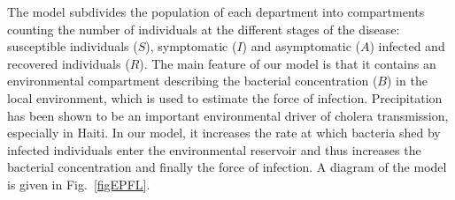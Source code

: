The model subdivides the population of each department into compartments counting the number of individuals at the different stages of the disease: susceptible individuals ($S$), symptomatic ($I$) and asymptomatic ($A$) infected and recovered individuals ($R$). The main feature of our model is that it contains an environmental compartment describing the bacterial concentration ($B$) in the local environment, which is used to estimate the force of infection\cite{Rinaldo:Reassessment20102011:2012, Bertuzzo:PredictionSpatialEvolution:2011}. Precipitation has been shown to be an important environmental driver of cholera transmission\cite{Camacho:CholeraEpidemicYemen:2018}, especially in Haiti\cite{Rinaldo:Reassessment20102011:2012}. In our model, it increases the rate at which bacteria shed by infected individuals enter the environmental reservoir and thus increases the bacterial concentration and finally the force of infection\cite{Lemaitre:RainfallDriverEpidemic:2019}. A diagram of the model is given in Fig.~\ref{figEPFL}.
